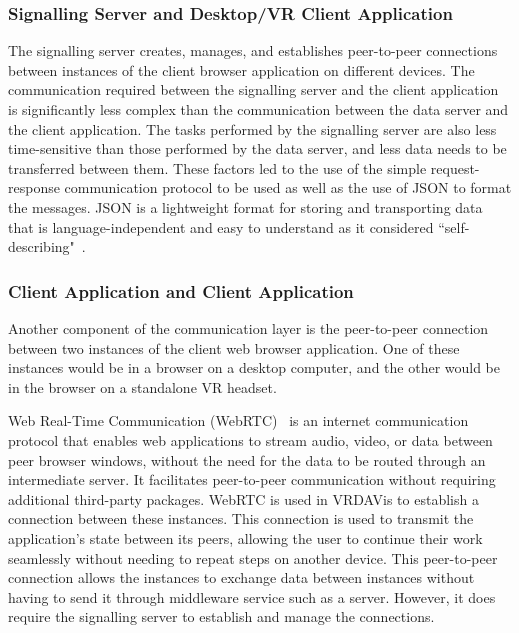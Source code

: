 \subsubsection{Signalling Server and Desktop/VR Client Application}
The signalling server creates, manages, and establishes peer-to-peer connections between instances of the client browser application on different devices.
The communication required between the signalling server and the client application is significantly less complex than the communication between the data server and the client application.
The tasks performed by the signalling server are also less time-sensitive than those performed by the data server, and less data needs to be transferred between them.
These factors led to the use of the simple request-response communication protocol to be used as well as the use of JSON to format the messages.
JSON is a lightweight format for storing and transporting data that is language-independent and easy to understand as it considered ``self-describing"~\cite{JSON}.

\subsubsection{Client Application and Client Application}
Another component of the communication layer is the peer-to-peer connection between two instances of the client web browser application. 
One of these instances would be in a browser on a desktop computer, and the other would be in the browser on a standalone VR headset. 

Web Real-Time Communication (WebRTC)~\cite{Blum2021, WebRTC} is an internet communication protocol that enables web applications to stream audio, video, or data between peer browser windows, without the need for the data to be routed through an intermediate server. 
It facilitates peer-to-peer communication without requiring additional third-party packages.
WebRTC is used in VRDAVis to establish a connection between these instances. 
This connection is used to transmit the application's state between its peers, allowing the user to continue their work seamlessly without needing to repeat steps on another device.
This peer-to-peer connection allows the instances to exchange data between instances without having to send it through middleware service such as a server. 
However, it does require the signalling server to establish and manage the connections. 

